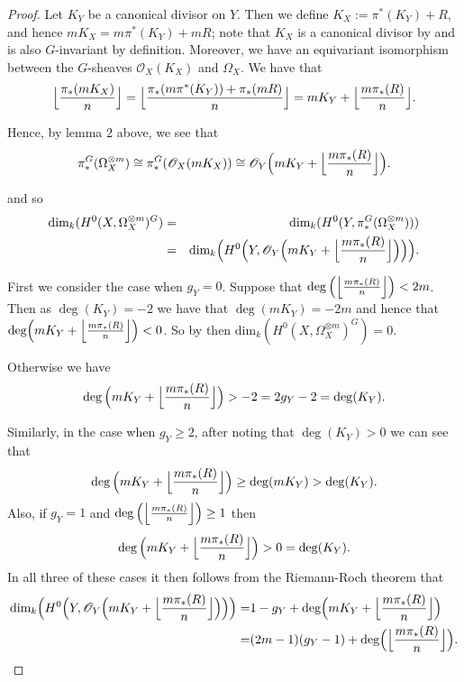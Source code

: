 \documentclass[11pt]{article} %
\begin{document}
\begin{proof}
	Let $K_Y$ be a canonical divisor on $Y$. Then we define $K_X:=\pi^*(K_Y)+R$, and hence $mK_X=m\pi^*(K_Y)+mR$; 
	note that $K_X$ is a canonical divisor by \citep[Chap. IV,\ prop 2.3]{hart} and is also $G$-invariant by definition. 
	Moreover, we have an equivariant isomorphism between 	the $G$-sheaves $\mathscr{O}_X(K_X)$ and $\Omega_X$. 
	We have that
		\[ 
		\Big{\lfloor}{\frac{\pi_*(mK_X)}{n}} \Big{\rfloor}
		= \Big{\lfloor}{\frac{\pi_*(m\pi^*(K_Y))+\pi_*(mR)}{n}} \Big{\rfloor}
		= mK_Y+\Big{\lfloor} {\frac{m\pi_*(R)}{n}}\Big{\rfloor}.
		\]
	
	Hence, by lemma 2 above, we see that 
		\[
		\pi_*^G(\Omega_X^{\otimes m})\cong \pi_*^G(\mathscr{O}_X(mK_X))\cong \mathscr{O}_Y\Big(mK_Y +\Big{\lfloor}{\frac{m\pi_*(R)}{n}}\Big{\rfloor}\Big).
		\]

	and so
		\begin{eqnarray*}
			\mbox{dim}_k(H^0(X,\Omega_{X}^{\otimes m})^G)&=&
			\mbox{dim}_k(H^0(Y,\pi_*^G(\Omega_{X}^{\otimes m})))\\
			&=&\mbox{dim}_k\Big(H^0\Big(Y,\mathscr{O}_Y\Big(mK_Y+\Big{\lfloor}{\frac{m\pi_*(R)}{n}}\Big{\rfloor}\Big)\Big)\Big).
		\end{eqnarray*}

	First we consider the case when $g_Y=0$. Suppose that $\deg\Big(\Big{\lfloor}{\frac{m\pi_* (R)}{n}}\Big{\rfloor}\Big) < 2m$. Then as $\deg(K_Y)=-2$ we have that $\deg(mK_Y)=-2m$ and hence that 		$\mbox{deg}\Big(mK_Y +\Big{\lfloor}{\frac{m\pi_*(R)}{n}}\Big{\rfloor}\Big)<0$. So by \citep[prop. 		3, {\S}8]{fulton} then $\mbox{dim}_k(H^0(X,\Omega_{X}^{\otimes m})^G)=0.$


	Otherwise we have 
		\[
		\deg\Big(mK_Y+\Big{\lfloor}\frac{m\pi_*(R)}{n}\Big{\rfloor}\Big)>-2=2g_Y-2=\deg(K_Y).
		\]

	Similarly, in the case when $g_Y\geq2$, after noting that $\deg(K_Y)>0$ we can see that
		\[
		\deg\Big(mK_Y+\Big{\lfloor}\frac{m\pi_*(R)}{n}\Big{\rfloor}\Big)\geq\deg(mK_Y)>\deg(K_Y).
		\]
	Also, if $g_Y=1$ and $\deg\Big(\Big{\lfloor}\frac{m\pi_*(R)}{n}\Big{\rfloor}\Big)\geq1$ then
		\[
		\deg\Big(mK_Y+\Big{\lfloor}\frac{m\pi_*(R)}{n}\Big{\rfloor}\Big)>0=\deg(K_Y).
		\]
	In all three of these cases it then follows from the Riemann-Roch theorem \citep[Cor. 2, {\S}8]{fulton} that 
		\begin{eqnarray*}
			\mbox{dim}_k\Big(H^0\Big(Y,\mathscr{O}_Y\Big(mK_Y+\Big{\lfloor}{\frac{m\pi_*(R)}{n}}\Big{\rfloor} \Big)\Big)\Big)= & 1-g_Y+\mbox{deg}\Big(mK_Y+\Big{\lfloor}							{\frac{m\pi_*(R)}{n}}\Big{\rfloor}\Big) \\
			= & (2m-1)(g_Y-1)+\mbox{deg}\Big(\Big{\lfloor}{\frac{m\pi_*(R)}{n}}\Big{\rfloor}\Big).
		\end{eqnarray*}


\end{proof}
\end{document}
